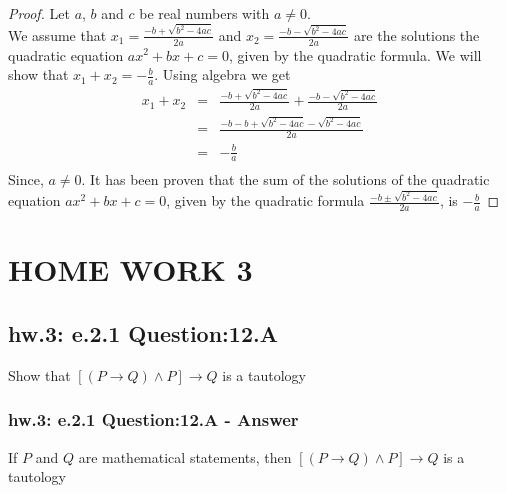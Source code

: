 \begin{proof}
Let $a$, $b$ and $c$ be real numbers with $a \neq 0$. \\
We assume that $x_1 = \frac{-b + \sqrt{b^2 -4ac}}{2a}$ and $x_2 = \frac{-b - \sqrt{b^2 -4ac}}{2a}$ are the solutions the quadratic equation $ax^2 + bx + c = 0$, given by the quadratic formula. We will show that $x_1 + x_2 = -\frac{b}{a}$. Using algebra we get
\begin{eqnarray*}
x_1 + x_2 & = & \frac{-b + \sqrt{b^2 -4ac}}{2a} + \frac{-b - \sqrt{b^2 -4ac}}{2a}   \nonumber \\
& = & \frac{-b - b + \sqrt{b^2 -4ac} - \sqrt{b^2 -4ac}}{2a} \nonumber \\
& = & - \frac{b}{a} \nonumber \\
\end{eqnarray*}
Since, $a \neq 0$. It has been proven that the sum of the solutions of the quadratic equation $ax^2 + bx + c = 0$, given by the quadratic formula $\frac{-b \pm \sqrt{b^2 -4ac}}{2a}$, is $ -\frac{b}{a}$
\end{proof}


\newpage
\section{HOME WORK 3}
\subsection{hw.3: e.2.1 Question:12.A}
Show that $[(P \to Q)\wedge P ] \to Q$ is a tautology

\subsubsection*{hw.3: e.2.1 Question:12.A - Answer}

\begin{tcolorbox}
\begin{theorem}
If $P$ and $Q$ are mathematical statements, then $[(P \to Q)\wedge P ] \to Q$ is a tautology
\end{theorem}
\end{tcolorbox}

